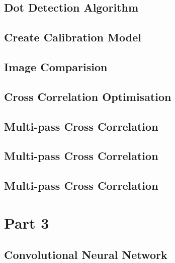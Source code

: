 \subsection{Dot Detection Algorithm}
 \label{code:2.1}

\subsection{Create Calibration Model}
 \label{code:2.2}

\subsection{Image Comparision}
 \label{code:2.3}

\subsection{Cross Correlation Optimisation}
 \label{code:2.4}

\subsection{Multi-pass Cross Correlation}
 \label{code:2.5}

\subsection{Multi-pass Cross Correlation}
 \label{code:2.6}

\subsection{Multi-pass Cross Correlation}
 \label{code:2.7}

\section{Part 3}
\subsection{Convolutional Neural Network}
 \label{code:3.1}

